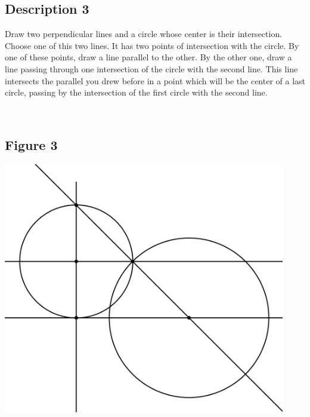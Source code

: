 \documentclass[12pt,a4paper,article,english,firamath]{nsi}
\begin{document}
\maketitle

\subsection*{Description 3}
{\brettley 

Draw two perpendicular lines and a circle whose center is their intersection.
Choose one of this two lines. It has two points of intersection with the circle. By one of these points, draw a line parallel to the other. By the other one, draw a line passing through one intersection of the circle with the second line. This line intersects the parallel you drew before in a point which will be the center of a last circle, passing by the intersection of the first circle with the second line.}\\


\subsection*{Figure 3}
\begin{center}
    \includegraphics[height=11cm]{img/fig03.png}
\end{center}
\end{document}
